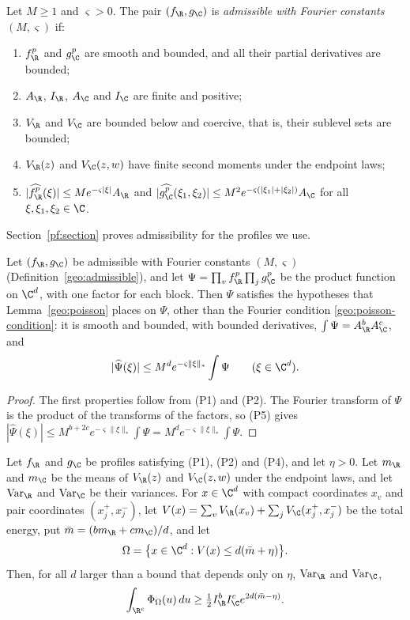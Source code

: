 \begin{definition}\label{geo:admissible}
Let $M\ge1$ and $\varsigma>0$. The pair $(f_\R,g_\C)$ is \emph{admissible
with Fourier constants $(M,\varsigma)$} if:
\begin{enumerate}
\item[(P1)] $f_\R^p$ and $g_\C^p$ are smooth and bounded, and all their
partial derivatives are bounded;
\item[(P2)] $A_\R$, $I_\R$, $A_\C$ and $I_\C$ are finite and positive;
\item[(P3)] $V_\R$ and $V_\C$ are bounded below and coercive, that is,
their sublevel sets are bounded;
\item[(P4)] $V_\R(z)$ and $V_\C(z,w)$ have finite second moments under
the endpoint laws;
\item[(P5)] $|\widehat{f_\R^p}(\xi)|\le Me^{-\varsigma|\xi|}A_\R$ and
$|\widehat{g_\C^p}(\xi_1,\xi_2)|\le M^2e^{-\varsigma(|\xi_1|+|\xi_2|)}A_\C$
for all $\xi,\xi_1,\xi_2\in\C$.
\end{enumerate}
\end{definition}

Section~\ref{pf:section} proves admissibility for the profiles we use.

\begin{lemma}\label{geo:tensor}
Let $(f_\R,g_\C)$ be admissible with Fourier constants $(M,\varsigma)$
(Definition~\ref{geo:admissible}), and
let $\Psi=\prod_vf_\R^p\prod_jg_\C^p$ be the product function on $\C^d$,
with one factor for each block. Then $\Psi$ satisfies the hypotheses that
Lemma~\ref{geo:poisson} places on $\Psi$, other than the Fourier condition
\eqref{geo:poisson-condition}: it is smooth and bounded, with bounded
derivatives, $\int\Psi=A_\R^bA_\C^c$, and
\[
 |\widehat\Psi(\xi)|\le M^de^{-\varsigma\|\xi\|_*}\int\Psi\qquad(\xi\in\C^d).
\]
\end{lemma}

\begin{proof}
The first properties follow from (P1) and (P2). The Fourier transform of
$\Psi$ is the product of the transforms of the factors, so (P5) gives
$|\widehat\Psi(\xi)|\le M^{b+2c}e^{-\varsigma\|\xi\|_*}\int\Psi
=M^de^{-\varsigma\|\xi\|_*}\int\Psi$.
\end{proof}

\begin{lemma}\label{geo:concentration}
Let $f_\R$ and $g_\C$ be profiles satisfying (P1), (P2) and (P4), and let
$\eta>0$. Let $m_\R$ and $m_\C$ be the means of $V_\R(z)$ and $V_\C(z,w)$
under the endpoint laws, and let $\mathrm{Var}_\R$ and $\mathrm{Var}_\C$ be
their variances. For $x\in\C^d$ with compact coordinates $x_v$ and pair
coordinates $(x_j^+,x_j^-)$, let
$V(x)=\sum_vV_\R(x_v)+\sum_jV_\C(x_j^+,x_j^-)$ be the total energy, put
$\bar m=(bm_\R+cm_\C)/d$, and let
\[
 \Omega=\bigl\{x\in\C^d:V(x)\le d(\bar m+\eta)\bigr\}.
\]
Then, for all $d$ larger than a bound that depends only on $\eta$,
$\mathrm{Var}_\R$ and $\mathrm{Var}_\C$,
\[
 \int_{\R^c}\Phi_\Omega(u)\,du\ge\tfrac12I_\R^bI_\C^ce^{2d(\bar m-\eta)}.
\]
\end{lemma}

